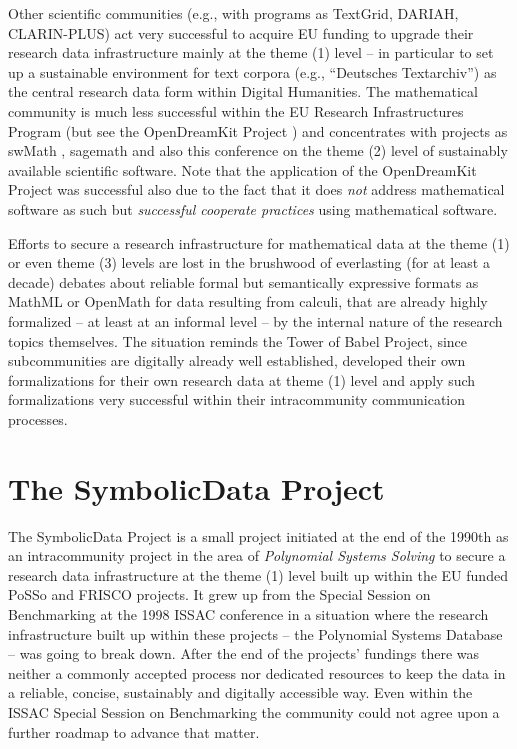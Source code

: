 \documentclass[runningheads,a4paper]{llncs}
\newcommand{\SD}{{\sc Symbo\-lic\-Data}}
\begin{document}
Other scientific communities (e.g., with programs as TextGrid, DARIAH,
CLARIN-PLUS) act very successful to acquire EU funding to upgrade their
research data infrastructure mainly at the theme (1) level -- in particular to
set up a sustainable environment for text corpora (e.g., ``Deutsches
Textarchiv'') as the central research data form within Digital Humanities.  The
mathematical community is much less successful within the EU Research
Infrastructures Program \cite{h2020} (but see the OpenDreamKit Project
\cite{odk}) and concentrates with projects as swMath \cite{swmath}, sagemath
\cite{sagemath} and also this conference on the theme (2) level of sustainably
available scientific software.  Note that the application of the OpenDreamKit
Project was successful also due to the fact that it does \emph{not} address
mathematical software as such but \emph{successful cooperate practices} using
mathematical software.

Efforts to secure a research infrastructure for mathematical data at the theme
(1) or even theme (3) levels are lost in the brushwood of everlasting (for at
least a decade) debates about reliable formal but semantically expressive
formats as MathML or OpenMath for data resulting from calculi, that are already
highly formalized -- at least at an informal level -- by the internal nature of
the research topics themselves.  The situation reminds the Tower of Babel
Project, since subcommunities are digitally already well established, developed
their own formalizations for their own research data at theme (1) level and
apply such formalizations very successful within their intracommunity
communication processes.

\section{The {\SD} Project}

The {\SD} Project is a small project initiated at the end of the 1990th as an
intracommunity project in the area of \emph{Polynomial Systems Solving} to
secure a research data infrastructure at the theme (1) level built up within
the EU funded PoSSo \cite{PoSSo} and FRISCO \cite{FRISCO} projects. It grew up
from the Special Session on Benchmarking at the 1998 ISSAC conference in a
situation where the research infrastructure built up within these projects --
the Polynomial Systems Database -- was going to break down.  After the end of
the projects' fundings there was neither a commonly accepted process nor
dedicated resources to keep the data in a reliable, concise, sustainably and
digitally accessible way. Even within the ISSAC Special Session on Benchmarking
the community could not agree upon a further roadmap to advance that matter.
\end{document}
